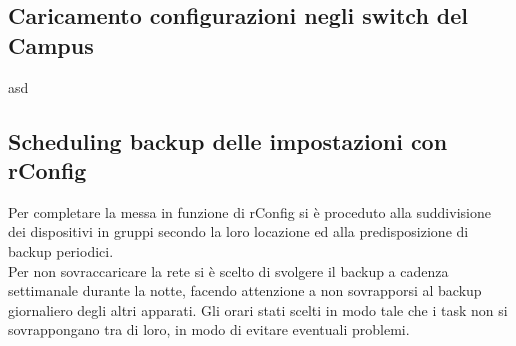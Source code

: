 \documentclass[Realizzazione.tex]{subfiles}
\begin{document}
\subsection{Caricamento configurazioni negli switch del Campus} 
asd

\subsection{Scheduling backup delle impostazioni con rConfig}

Per completare la messa in funzione di rConfig si è proceduto alla suddivisione dei dispositivi in gruppi secondo la loro locazione ed alla predisposizione di backup periodici. \\
Per non sovraccaricare la rete si è scelto di svolgere il backup a cadenza settimanale durante la notte, facendo attenzione a non sovrapporsi al backup giornaliero degli altri apparati. Gli orari stati scelti in modo tale che i task non si sovrappongano tra di loro, in modo di evitare eventuali problemi.\\
\end{document}
